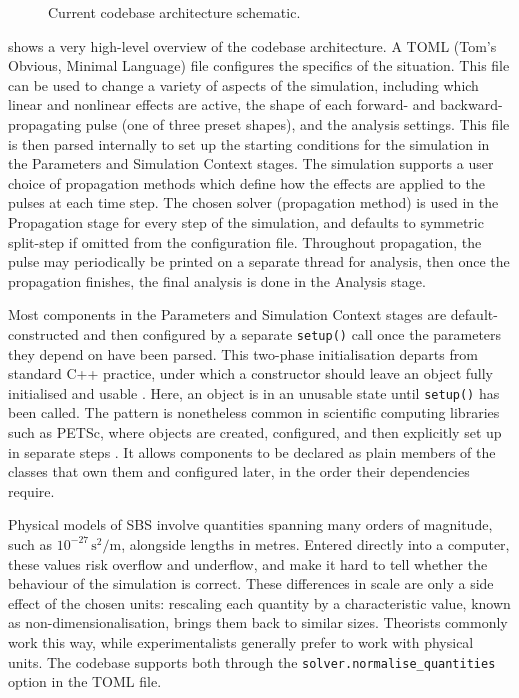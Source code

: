 \begin{figure}
  \centering
  \caption{Current codebase architecture schematic.}
  \label{fig:codebase-architecture}
\end{figure}


 shows a very high-level overview of the codebase architecture.
A TOML (Tom's Obvious, Minimal Language) file configures the specifics of the situation. This file can be used to change a variety of aspects of the simulation, including which linear and nonlinear effects are active, the shape of each forward- and backward-propagating pulse (one of three preset shapes), and the analysis settings.
This file is then parsed internally to set up the starting conditions for the simulation in the Parameters and Simulation Context stages.
The simulation supports a user choice of propagation methods which define how the effects are applied to the pulses at each time step.
The chosen solver (propagation method) is used in the Propagation stage for every step of the simulation, and defaults to symmetric split-step if omitted from the configuration file.
Throughout propagation, the pulse may periodically be printed on a separate thread for analysis, then once the propagation finishes, the final analysis is done in the Analysis stage.

Most components in the Parameters and Simulation Context stages are default-constructed and then configured by a separate
\texttt{setup()} call once the parameters they depend on have been parsed.
This two-phase initialisation departs from standard C++ practice, under which
a constructor should leave an object fully initialised and usable
\parencite{stroustrupCoreGuidelines}. Here, an object is in an unusable state until
\texttt{setup()} has been called. The pattern is nonetheless common in
scientific computing libraries such as PETSc, where objects are created,
configured, and then explicitly set up in separate steps \parencite{balayPETScTAOUsers2025}.
It allows components to be declared as plain members of the classes that own
them and configured later, in the order their dependencies require.

Physical models of SBS involve quantities spanning many orders of magnitude, such as $10^{-27}\,\mathrm{s^2/m}$, alongside lengths in metres.
Entered directly into a computer, these values risk overflow and underflow, and make it hard to tell whether the behaviour of the simulation is correct.
These differences in scale are only a side effect of the chosen units: rescaling each quantity by a characteristic value, known as non-dimensionalisation, brings them back to similar sizes.
Theorists commonly work this way, while experimentalists generally prefer to work with physical units.
The codebase supports both through the \texttt{solver.normalise\_quantities} option in the TOML file.


